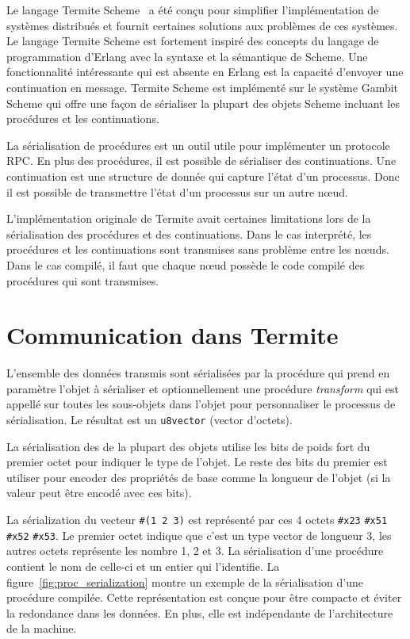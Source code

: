 Le langage Termite Scheme~\cite{DBLP:conf/erlang/Germain06} a été conçu
pour simplifier l'implémentation de systèmes distribués et fournit
certaines solutions aux problèmes de ces systèmes. Le langage Termite Scheme est
fortement inspiré des concepts du langage de programmation d'Erlang avec la
syntaxe et la sémantique de Scheme. Une fonctionnalité intéressante qui est
absente en Erlang est la capacité d'envoyer une continuation en message.
Termite Scheme est implémenté sur le système Gambit Scheme qui offre
une façon de sérialiser la plupart des objets Scheme incluant les
procédures et les continuations.

La sérialisation de procédures est un outil utile pour implémenter
un protocole RPC. En plus des procédures, il est possible de sérialiser
des continuations. Une continuation est une structure de donnée qui capture
l'état d'un processus. Donc il est possible de transmettre l'état d'un
processus sur un autre nœud.

L'implémentation originale de Termite avait certaines limitations
lors de la sérialisation des procédures et des continuations. Dans
le cas interprété, les procédures et les continuations sont transmises
sans problème entre les nœuds. Dans le cas compilé, il faut que
chaque nœud possède le code compilé des procédures qui sont transmises.


\section{Communication dans Termite}

L'ensemble des données transmis sont sérialisées par la procédure
 qui prend en paramètre l'objet à sérialiser et
optionnellement une procédure \textit{transform} qui est appellé sur toutes les
sous-objets dans l'objet pour personnaliser le processus de sérialisation. Le
résultat est un \texttt{u8vector} (vector d'octets).

La sérialisation des de la plupart des objets utilise les bits de poids fort
du premier octet pour indiquer le type de l'objet. Le reste des bits du
premier est utiliser pour encoder des propriétés de base comme la longueur
de l'objet (si la valeur peut être encodé avec ces bits).

La sérialization du vecteur \texttt{\#(1 2 3)} est représenté par ces 4 octets
\texttt{\#x23} \texttt{\#x51} \texttt{\#x52} \texttt{\#x53}.  Le premier octet
indique que c'est un type vector de longueur 3, les autres octets représente
les nombre 1, 2 et 3.  La sérialisation d'une procédure contient le nom de
celle-ci et un entier qui l'identifie. La figure~\ref{fig:proc_serialization}
montre un exemple de la sérialisation d'une procédure compilée. Cette
représentation est conçue pour être compacte et éviter la redondance dans les
données. En plus, elle est indépendante de l'architecture de la machine.

